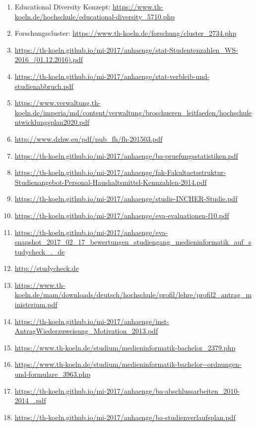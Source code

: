 \documentclass[BCOR12mm,DIV11,titlepage,a4paper,oneside,10pt]{scrbook}
\begin{document}
\begin{sloppypar}
\begin{flushleft}

\begin{enumerate}
\item{Educational Diversity Konzept: \url{https://www.th-koeln.de/hochschule/educational-diversity\_5710.php} } 
\item{Forschungscluster: \url{https://www.th-koeln.de/forschung/cluster\_2734.php} } 
\item{\url{https://th-koeln.github.io/mi-2017/anhaenge/stat-Studentenzahlen\_WS-2016\_(01.12.2016).pdf}} 
\item{\url{https://th-koeln.github.io/mi-2017/anhaenge/stat-verbleib-und-studienabbruch.pdf}} 
\item{\url{https://www.verwaltung.th-koeln.de/imperia/md/content/verwaltung/broschueren\_leitfaeden/hochschulentwicklungsplan2020.pdf}} 
\item{\url{http://www.dzhw.eu/pdf/pub\_fh/fh-201503.pdf}} 
\item{\url{https://th-koeln.github.io/mi-2017/anhaenge/ba-pruefungsstatistiken.pdf}} 
\item{\url{https://th-koeln.github.io/mi-2017/anhaenge/fak-Fakultaetsstruktur-Studienangebot-Personal-Haushaltsmittel-Kennzahlen-2014.pdf}} 
\item{\url{https://th-koeln.github.io/mi-2017/anhaenge/studie-INCHER-Studie.pdf}} 
\item{\url{https://th-koeln.github.io/mi-2017/anhaenge/eva-evaluationen-f10.pdf}} 
\item{\url{https://th-koeln.github.io/mi-2017/anhaenge/eva-snapshot\_2017\_02\_17\_bewertungen\_studiengang\_medieninformatik\_auf\_studycheck\_.\_de}} 
\item{\url{http://studycheck.de}} 
\item{\url{https://www.th-koeln.de/mam/downloads/deutsch/hochschule/profil/lehre/profil2\_antrag\_ministerium.pdf}} 
\item{\url{https://th-koeln.github.io/mi-2017/anhaenge/inst-AntragWiederzuweisung\_Motivation\_2013.pdf}} 
\item{\url{https://www.th-koeln.de/studium/medieninformatik-bachelor\_2379.php}} 
\item{\url{https://www.th-koeln.de/studium/medieninformatik-bachelor--ordnungen-und-formulare\_3963.php}} 
\item{\url{https://th-koeln.github.io/mi-2017/anhaenge/ba-abschlussarbeiten\_2010-2014\_.pdf}} 
\item{\url{https://th-koeln.github.io/mi-2017/anhaenge/ba-studienverlaufsplan.pdf}} 

\end{enumerate}
\end{flushleft}
\end{sloppypar}
\end{document}
